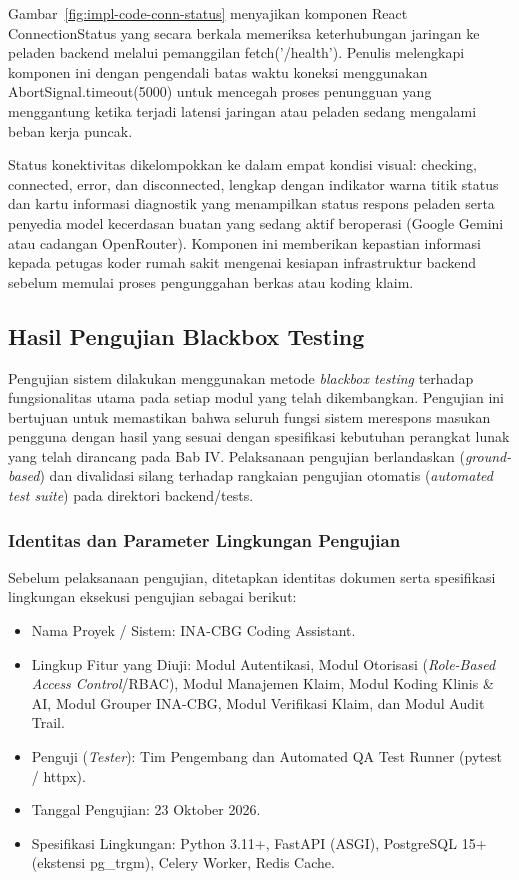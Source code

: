 Gambar~\ref{fig:impl-code-conn-status} menyajikan komponen React ConnectionStatus yang secara berkala memeriksa keterhubungan jaringan ke peladen backend melalui pemanggilan fetch('/health'). Penulis melengkapi komponen ini dengan pengendali batas waktu koneksi menggunakan AbortSignal.timeout(5000) untuk mencegah proses penungguan yang menggantung ketika terjadi latensi jaringan atau peladen sedang mengalami beban kerja puncak.

Status konektivitas dikelompokkan ke dalam empat kondisi visual: checking, connected, error, dan disconnected, lengkap dengan indikator warna titik status dan kartu informasi diagnostik yang menampilkan status respons peladen serta penyedia model kecerdasan buatan yang sedang aktif beroperasi (Google Gemini atau cadangan OpenRouter). Komponen ini memberikan kepastian informasi kepada petugas koder rumah sakit mengenai kesiapan infrastruktur backend sebelum memulai proses pengunggahan berkas atau koding klaim.

\subsection{Hasil Pengujian Blackbox Testing}
Pengujian sistem dilakukan menggunakan metode \textit{blackbox testing} terhadap fungsionalitas utama pada setiap modul yang telah dikembangkan. Pengujian ini bertujuan untuk memastikan bahwa seluruh fungsi sistem merespons masukan pengguna dengan hasil yang sesuai dengan spesifikasi kebutuhan perangkat lunak yang telah dirancang pada Bab IV. Pelaksanaan pengujian berlandaskan (\textit{ground-based}) dan divalidasi silang terhadap rangkaian pengujian otomatis (\textit{automated test suite}) pada direktori backend/tests.

\subsubsection{Identitas dan Parameter Lingkungan Pengujian}
Sebelum pelaksanaan pengujian, ditetapkan identitas dokumen serta spesifikasi lingkungan eksekusi pengujian sebagai berikut:
\begin{itemize}[leftmargin=1.5em, itemsep=1pt]
  \item Nama Proyek / Sistem: INA-CBG Coding Assistant.
  \item Lingkup Fitur yang Diuji: Modul Autentikasi, Modul Otorisasi (\textit{Role-Based Access Control}/RBAC), Modul Manajemen Klaim, Modul Koding Klinis \& AI, Modul Grouper INA-CBG, Modul Verifikasi Klaim, dan Modul Audit Trail.
  \item Penguji (\textit{Tester}): Tim Pengembang dan Automated QA Test Runner (pytest / httpx).
  \item Tanggal Pengujian: 23 Oktober 2026.
  \item Spesifikasi Lingkungan: Python 3.11+, FastAPI (ASGI), PostgreSQL 15+ (ekstensi pg\_trgm), Celery Worker, Redis Cache.
\end{itemize}

